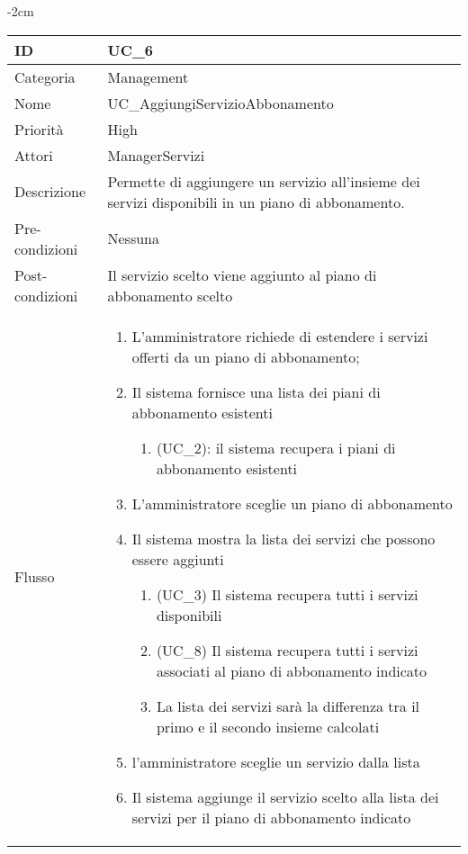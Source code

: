 \begin{center}
\begin{table}[bp]
    \centering
    \addtolength{\leftskip} {-2cm}
\begin{tabular}{ |p{2.6cm}|p{13cm}|  }
\hline
ID & UC\_6 \\\hline
Categoria & Management\\\hline
Nome & UC\_AggiungiServizioAbbonamento\\\hline
Priorità & High \\\hline
Attori &  ManagerServizi \\\hline
Descrizione & Permette di aggiungere un servizio all'insieme dei servizi disponibili in un piano di abbonamento.\\\hline
Pre-condizioni & Nessuna \\\hline
Post-condizioni &  Il servizio scelto viene aggiunto al piano di abbonamento scelto \\\hline
Flusso &  	\begin{enumerate}
		\item L'amministratore richiede di estendere i servizi offerti da un piano di abbonamento;
		\item Il sistema fornisce una lista dei piani di abbonamento esistenti
		\begin{enumerate}[  ]
			\item (UC\_2): il sistema recupera i piani di abbonamento esistenti
		\end{enumerate}
		\item L'amministratore sceglie un piano di abbonamento
		\item Il sistema mostra la lista dei servizi che possono essere aggiunti		
			\begin{enumerate}[label*=\arabic*.]
			\item (UC\_3) Il sistema recupera tutti i servizi disponibili
			\item (UC\_8) Il sistema recupera tutti i servizi associati al piano di abbonamento indicato
			\item La lista dei servizi sarà la differenza tra il primo e il secondo insieme calcolati
			\end{enumerate}
		\item l'amministratore sceglie un servizio dalla lista
		\item Il sistema aggiunge il servizio scelto alla lista dei servizi per il piano di abbonamento indicato
		\end{enumerate}\\\hline
\end{tabular}
\label{table_use_case:6}\newline
\end{table}


\end{center}
